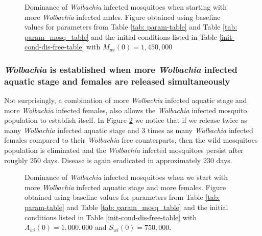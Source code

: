 \documentclass{ws-rv9x6}
\begin{document}
\begin{figure}[H]
    \centering
    
    \caption{Dominance of \textit{Wolbachia} infected mosquitoes when starting with more \textit{Wolbachia} infected males. Figure  obtained using baseline values for parameters from Table \ref{tab: param-table} and Table \ref{tab: param_mosq_table} and the initial conditions listed in Table \ref{init-cond-dis-free-table} with $M_{wi}(0)=1,450,000$ }
    \label{domwolbmales}
\end{figure}


\subsubsection{\textit{Wolbachia} is established when more \textit{Wolbachia} infected  aquatic stage and females are released simultaneously}

Not surprisingly, a combination of more \textit{Wolbachia} infected aquatic stage and more \textit{Wolbachia} infected females, also allows the \textit{Wolbachia} infected mosquito population to establish itself. In Figure \ref{domwolbaqfem} we notice that if we release twice as many \textit{Wolbachia} infected aquatic stage and 3 times as many \textit{Wolbachia} infected females compared to their \textit{Wolbachia} free counterparts, then the wild mosquitoes population is eliminated and the \textit{Wolbachia} infected mosquitoes persist after roughly 250 days. Disease is again eradicated in approximately 230 days.

\begin{figure}[H]
    \centering
    
    \caption{Dominance of \textit{Wolbachia} infected mosquitoes when we start with more \textit{Wolbachia} infected aquatic stage and more females. Figure  obtained using baseline values for parameters from Table \ref{tab: param-table} and Table \ref{tab: param_mosq_table} and the initial conditions listed in Table \ref{init-cond-dis-free-table} with $A_{wi}(0)=1,000,000$ and $S_{wi}(0)=750,000$.}
    \label{domwolbaqfem}
\end{figure} 
\end{document}
